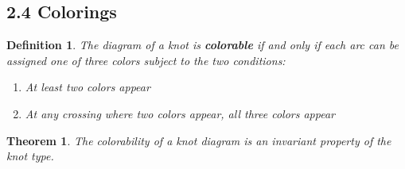 \documentclass[executivepaper]{article}
\newtheorem{definition}{Definition}
\newtheorem{theorem}{Theorem}
\begin{document}
\subsection*{2.4 Colorings}

\begin{tcolorbox}

\begin{definition}

\textit{The diagram of a knot is \textbf{colorable} if and only if each arc can be assigned one of three colors subject to the two conditions:}

\begin{center}

\begin{enumerate}

\item At least two colors appear

\item At any crossing where two colors appear, all three colors appear

\end{enumerate}

\end{center}

\end{definition}

\end{tcolorbox}

\vspace{2mm}

\begin{tcolorbox}

\begin{theorem}

\textit{The colorability of a knot diagram is an invariant property of the knot type.}

\end{theorem}

\end{tcolorbox}

\pagebreak

\vspace*{-20mm}
\end{document}
